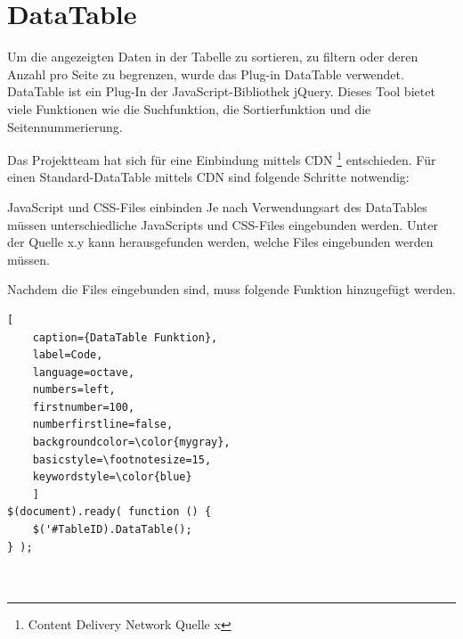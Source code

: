 \section{DataTable} \label{sec:DataTable}
Um die angezeigten Daten in der Tabelle zu sortieren, zu filtern oder deren Anzahl pro Seite zu begrenzen, wurde das Plug-in DataTable verwendet. DataTable ist ein Plug-In der JavaScript-Bibliothek jQuery. Dieses Tool bietet viele Funktionen wie die Suchfunktion, die Sortierfunktion und die Seitennummerierung.

Das Projektteam hat sich für eine Einbindung mittels CDN \footnote{Content Delivery Network Quelle x}  entschieden.
Für einen Standard-DataTable mittels CDN sind folgende Schritte notwendig:

JavaScript und CSS-Files einbinden
\newline Je nach Verwendungsart des DataTables müssen unterschiedliche JavaScripts und CSS-Files eingebunden werden. Unter der  Quelle x.y kann herausgefunden werden, welche Files eingebunden werden müssen. 

Nachdem die Files eingebunden sind, muss folgende Funktion hinzugefügt werden.
\renewcommand{\lstlistingname}{Quellcode}

\begin{lstlisting}[
	caption={DataTable Funktion},
	label=Code,
	language=octave,
	numbers=left,
	firstnumber=100,
	numberfirstline=false,
	backgroundcolor=\color{mygray},
	basicstyle=\footnotesize=15,
	keywordstyle=\color{blue}
	]
$(document).ready( function () {
	$('#TableID).DataTable();
} );

	
\end{lstlisting}

